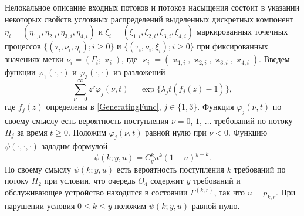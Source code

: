 \documentclass[a4paper,12pt,russian]{extarticle}
\begin{document}
Нелокальное описание входных потоков и потоков насыщения состоит в указании некоторых свойств условных распределений выделенных дискретных компонент $\eta_i=(\eta_{1,i},\eta_{2,i}, \eta_{3,i}, \eta_{4,i})$ и $\xi_i=(\xi_{1,i}, \xi_{2,i}, \xi_{3,i}, \xi_{4,i})$ маркированных точечных процессов \linebreak $\{(\tau_i, \nu_i, \eta_i); i\geqslant 0\}$ и $\{(\tau_i, \nu_i, \xi_i); i\geqslant 0\}$ при фиксированных значениях метки $\nu_i = (\Gamma_i;\varkappa_i)$, где $\varkappa_i=(\varkappa_{1,i},\varkappa_{2,i},\varkappa_{3,i},\varkappa_{4,i})$. 
Введем функции $\varphi_1(\cdot,\cdot)$ и $\varphi_3(\cdot,\cdot)$ из разложений 
\begin{equation*}
\sum_{\nu=0}^{\infty} z^\nu\varphi_j(\nu,t) = \exp\{\lambda_j t (f_j(z)-1)\},
\end{equation*}
где $f_j(z)$ определены в \eqref{GeneratingFunc}, $j \in \{1,3\}$. Функция $\varphi_j(\nu,t)$ по своему смыслу есть вероятность поступления $\nu=0$, $1$, $\ldots$ требований по потоку $\Pi_j$ за время $t \geqslant 0$. Положим $\varphi_j(\nu,t)$ равной нулю при $\nu < 0$. Функцию $\psi(\cdot,\cdot,\cdot)$ зададим формулой
\begin{equation*}
\psi(k;y,u)=C_y^k u^k (1-u)^{y-k}.	
\end{equation*}
По своему смыслу $\psi(k;y,u)$ есть вероятность поступления $k$ требований по потоку $\Pi_2$ при условии, что очередь $O_4$ содержит $y$ требований и обслуживающее устройство находится в состоянии $\Gamma^{(k,r)}$, так что $u=p_{k,r}$. При нарушении условия $ 0\leqslant k \leqslant y$ положим $\psi(k;y,u)$ равной нулю.
\end{document}
